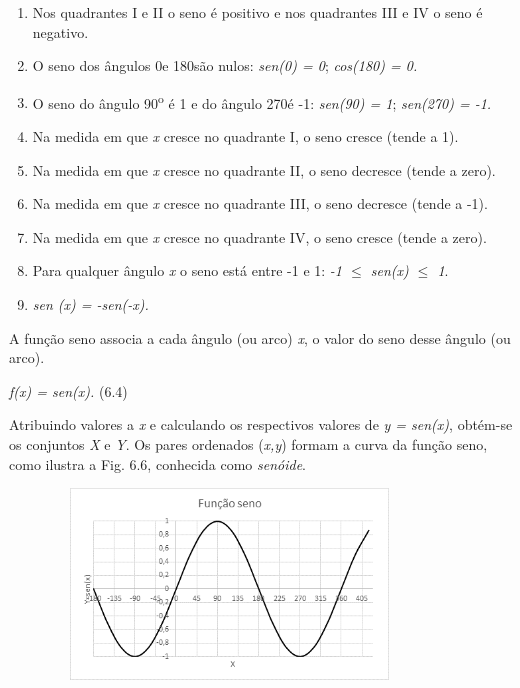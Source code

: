 \begin{caixa}
\begin{enumerate}
    \item Nos quadrantes I e II o seno é positivo e nos quadrantes III e IV o seno é negativo.

    \item O seno dos ângulos 0\degree e 180\degree  são nulos:\textit{ sen(0\degree) = 0};  \textit{cos(180\degree) = 0.}

    \item O seno do ângulo 90\textsuperscript{o} é 1 e do ângulo 270\degree é -1: \textit{sen(90\degree) = 1};  \textit{sen(270\degree) = -1.}

    \item Na medida em que \textit{x} cresce no quadrante I, o seno cresce (tende a 1).

    \item Na medida em que \textit{x} cresce no quadrante II, o seno decresce (tende a zero).

    \item Na medida em que \textit{x} cresce no quadrante III, o seno decresce (tende a -1).

    \item Na medida em que \textit{x} cresce no quadrante IV, o seno cresce (tende a zero).

    \item Para qualquer ângulo \textit{x}  o seno está entre -1 e 1:   \textit{-1 $ \leq $  sen(x) $ \leq $  1}.

    \item \textit{sen (x) = -sen(-x).}
\end{enumerate}
\end{caixa}

\begin{caixa}
A função seno associa a cada ângulo (ou arco) \textit{x}, o valor do seno desse ângulo (ou arco).

\textit{f(x) = sen(x).} \tab (6.4)
\end{caixa}

Atribuindo valores a \textit{x} e calculando os respectivos valores de \textit{y = sen(x)}, obtém-se os conjuntos \textit{X }e\textit{ Y}. Os pares ordenados (\textit{x,y}) formam a curva da função seno, como ilustra a Fig. 6.6, conhecida como \textit{senóide}.

\begin{figure}[H]
    \begin{Center}
        \includegraphics[width=3.76in,height=2.0in]{capitulos/trigonometria_e_funcoes_trigonometricas/media/image35.png}
    \end{Center}
\end{figure}

